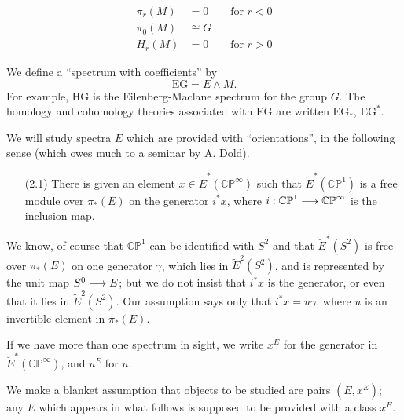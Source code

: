 \documentclass[../main]{subfiles}
\begin{document}
\begin{align*}
\pi_r(M) & = 0 \qquad \text {for } r < 0 \\ \pi_0(M) & \cong G \\ H_r(M) & = 0 \qquad \text {for } r > 0
\end{align*}

We define a ``spectrum with coefficients'' by $$\mathrm{EG} = E \wedge M.$$ For example, HG is the Eilenberg-Maclane spectrum for the group $G$. The homology and cohomology theories associated with EG are written $\mathrm {EG}_\ast$, $\mathrm {EG}^\ast$.

We will study spectra $E$ which are provided with ``orientations'', in the following sense (which owes much to a seminar by A. Dold). 

\begin{enumerate}
    \item[(2.1)] There is given an element $x \in {\tilde E}^\ast(\mathbb {CP}^\infty)$ such that ${\tilde E}^\ast(\mathbb {CP}^1)$ is a free module over $\pi_\ast(E)$ on the generator $i^\ast x$, where $i : \mathbb {CP}^1 \overset{}{\longrightarrow} \mathbb {CP}^\infty$ is the inclusion map. 
\end{enumerate}

We know, of course that $\mathbb {CP}^1$ can be identified with $S^2$ and that ${\breve E}^\ast(S^2)$ is free over $\pi_\ast(E)$ on one generator $\gamma$, which lies in ${\tilde E}^2(S^2)$, and is represented by the unit map $S^0 \overset{}{\longrightarrow} E$; but we do not insist that $i^\ast x$ is the generator, or even that it lies in ${\tilde E}^2(S^2)$. Our assumption says only that $i^\ast x = u \gamma$, where $u$ is an invertible element in $\pi_\ast(E)$. 

If we have more than one spectrum in sight, we write $x^E$ for the generator in ${\breve E}^\ast(\mathbb {CP}^\infty)$, and $u^E$ for $u$.

We make a blanket assumption that objects to be studied are pairs $(E, x^E)$; any $E$ which appears in what follows is supposed to be provided with a class $x^E$. 
\end{document}
